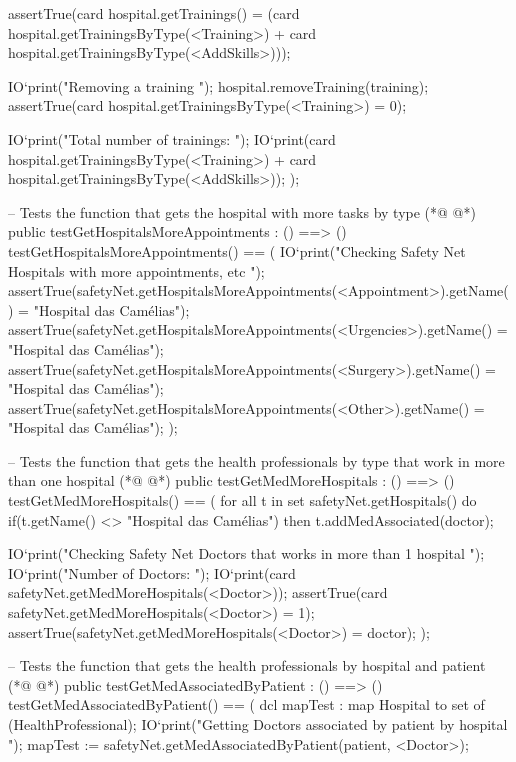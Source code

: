 \begin{vdmpp}[breaklines=true]
    assertTrue(card hospital.getTrainings() = (card hospital.getTrainingsByType(<Training>) + card hospital.getTrainingsByType(<AddSkills>)));
    
    IO`print("\n Removing a training \n");
    hospital.removeTraining(training);
    assertTrue(card hospital.getTrainingsByType(<Training>) = 0);
    
    IO`print("\n\n Total number of trainings: ");
    IO`print(card hospital.getTrainingsByType(<Training>) + card hospital.getTrainingsByType(<AddSkills>));
  );
  
  -- Tests the function that gets the hospital with more tasks by type
(*@
\label{testGetHospitalsMoreAppointments:258}
@*)
  public testGetHospitalsMoreAppointments : () ==> ()
   testGetHospitalsMoreAppointments() == ( 
    IO`print("\n Checking Safety Net Hospitals with more appointments, etc \n");
    assertTrue(safetyNet.getHospitalsMoreAppointments(<Appointment>).getName() = "Hospital das Camélias");
    assertTrue(safetyNet.getHospitalsMoreAppointments(<Urgencies>).getName() = "Hospital das Camélias");
    assertTrue(safetyNet.getHospitalsMoreAppointments(<Surgery>).getName() = "Hospital das Camélias");
    assertTrue(safetyNet.getHospitalsMoreAppointments(<Other>).getName() = "Hospital das Camélias");
   );
  
  -- Tests the function that gets the health professionals by type that work in more than one hospital
(*@
\label{testGetMedMoreHospitals:268}
@*)
  public testGetMedMoreHospitals : () ==> ()
   testGetMedMoreHospitals() == (
    for all t in set safetyNet.getHospitals() do
     if(t.getName() <> "Hospital das Camélias")
      then t.addMedAssociated(doctor);
    
    IO`print("\n Checking Safety Net Doctors that works in more than 1 hospital \n");
    IO`print("\n Number of Doctors: "); 
    IO`print(card safetyNet.getMedMoreHospitals(<Doctor>)); 
    assertTrue(card safetyNet.getMedMoreHospitals(<Doctor>) = 1);
    assertTrue(safetyNet.getMedMoreHospitals(<Doctor>) = {doctor});  
   );
  
  -- Tests the function that gets the health professionals by hospital and patient
(*@
\label{testGetMedAssociatedByPatient:282}
@*)
  public testGetMedAssociatedByPatient : () ==> ()
   testGetMedAssociatedByPatient() == (
    dcl mapTest : map Hospital to set of (HealthProfessional);
    IO`print("\n\n Getting Doctors associated by patient by hospital \n");
    mapTest := safetyNet.getMedAssociatedByPatient(patient, <Doctor>);
    

\end{vdmpp}
